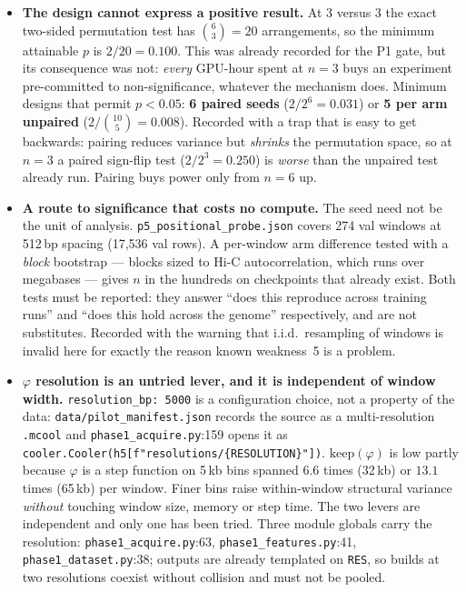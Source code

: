 \documentclass[11pt,a4paper]{article}
\newcommand{\code}[1]{\texttt{\small #1}}
\begin{document}
\begin{itemize}

\item \textbf{The design cannot express a positive result.} At 3 versus 3 the
exact two-sided permutation test has $\binom{6}{3} = 20$ arrangements, so the
minimum attainable $p$ is $2/20 = 0.100$. This was already recorded for the
P1 gate, but its consequence was not: \emph{every} GPU-hour spent at $n=3$ buys
an experiment pre-committed to non-significance, whatever the mechanism does.
Minimum designs that permit $p < 0.05$: \textbf{6 paired seeds}
($2/2^6 = 0.031$) or \textbf{5 per arm unpaired} ($2/\binom{10}{5} = 0.008$).
Recorded with a trap that is easy to get backwards: pairing reduces variance but
\emph{shrinks} the permutation space, so at $n=3$ a paired sign-flip test
($2/2^3 = 0.250$) is \emph{worse} than the unpaired test already run. Pairing
buys power only from $n=6$ up.

\item \textbf{A route to significance that costs no compute.} The seed need not
be the unit of analysis. \code{p5\_positional\_probe.json} covers 274 val
windows at 512\,bp spacing (17{,}536 val rows). A per-window arm difference
tested with a \emph{block} bootstrap --- blocks sized to Hi-C autocorrelation,
which runs over megabases --- gives $n$ in the hundreds on checkpoints that
already exist. Both tests must be reported: they answer ``does this reproduce
across training runs'' and ``does this hold across the genome'' respectively,
and are not substitutes. Recorded with the warning that i.i.d.\ resampling of
windows is invalid here for exactly the reason known weakness~5 is a problem.

\item \textbf{$\varphi$ resolution is an untried lever, and it is independent of
window width.} \code{resolution\_bp: 5000} is a configuration choice, not a
property of the data: \code{data/pilot\_manifest.json} records the source as a
multi-resolution \code{.mcool} and \code{phase1\_acquire.py}:159 opens it as
\code{cooler.Cooler(h5[f"resolutions/\{RESOLUTION\}"])}. $\mathrm{keep}(\varphi)$
is low partly because $\varphi$ is a step function on 5\,kb bins spanned $6.6$
times (32\,kb) or $13.1$ times (65\,kb) per window. Finer bins raise
within-window structural variance \emph{without} touching window size, memory or
step time. The two levers are independent and only one has been tried. Three
module globals carry the resolution: \code{phase1\_acquire.py}:63,
\code{phase1\_features.py}:41, \code{phase1\_dataset.py}:38; outputs are already
templated on \code{RES}, so builds at two resolutions coexist without collision
and must not be pooled.


\end{itemize}
\end{document}
